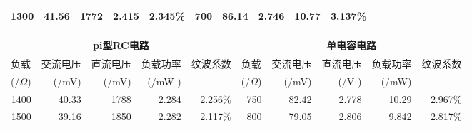 \documentclass{article}
\begin{document}
\begin{table}[p]
\begin{tabular}{|r|r|r|r|r|r|r|r|r|r|}
        \hline
        1300                          & 41.56                                & 1772                      & 2.415                     & 2.345\%                   & 700                     & 86.14                     & 2.746                     & 10.77                    & 3.137\% \bigstrut                   \\
        \hline
    \end{tabular}%
\end{table}%
\newpage
\begin{table}[t]
    \centering
    \begin{tabular}{rrrrr|r|r|r|r|r|}
        \hline
        \multicolumn{5}{|c|}{pi型RC电路}     & \multicolumn{5}{c|}{单电容电路} \bigstrut                                                                                                                                                                                                                                            \\
        \hline
        \multicolumn{1}{|l|}{负载}          & \multicolumn{1}{l|}{交流电压}            & \multicolumn{1}{l|}{直流电压}  & \multicolumn{1}{l|}{负载功率}   & \multicolumn{1}{l|}{纹波系数} & \multicolumn{1}{l|}{负载} & \multicolumn{1}{l|}{交流电压} & \multicolumn{1}{l|}{直流电压} & \multicolumn{1}{l|}{负载功率} & \multicolumn{1}{l|}{纹波系数} \bigstrut \\
        \multicolumn{1}{|r|}{(/$\Omega$)} & \multicolumn{1}{r|}{(/mV)}           & \multicolumn{1}{r|}{(/mV)} & \multicolumn{1}{r|}{(/mW )} &                           & (/$\Omega$)             & (/mV)                     & (/V )                     & (/mW)                     & \bigstrut                           \\
        \hline
        \multicolumn{1}{|r|}{1400}        & \multicolumn{1}{r|}{40.33}           & \multicolumn{1}{r|}{1788}  & \multicolumn{1}{r|}{2.284 } & 2.256\%                   & 750                     & 82.42                     & 2.778                     & 10.29                     & 2.967\% \bigstrut                   \\
        \hline
        \multicolumn{1}{|r|}{1500}        & \multicolumn{1}{r|}{39.16}           & \multicolumn{1}{r|}{1850}  & \multicolumn{1}{r|}{2.282 } & 2.117\%                   & 800                     & 79.05                     & 2.806                     & 9.842                     & 2.817\% \bigstrut                   \\

\end{tabular}
\end{table}
\end{document}
